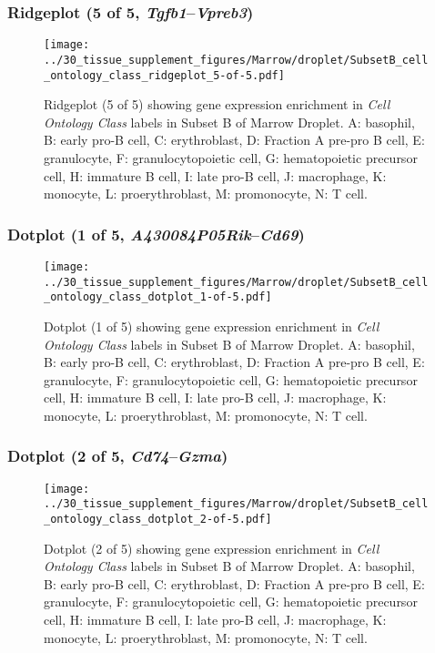 \clearpage

\subsubsection{Ridgeplot (5 of 5, \emph{Tgfb1}--\emph{Vpreb3})}
\begin{figure}[h]
\centering
\texttt{[image: ../30\_tissue\_supplement\_figures/Marrow/droplet/SubsetB\_cell\_ontology\_class\_ridgeplot\_5-of-5.pdf]}

\caption{ Ridgeplot (5 of 5)  showing gene expression enrichment in \emph{Cell Ontology Class} labels in Subset B of Marrow Droplet. A: basophil, B: early pro-B cell, C: erythroblast, D: Fraction A pre-pro B cell, E: granulocyte, F: granulocytopoietic cell, G: hematopoietic precursor cell, H: immature B cell, I: late pro-B cell, J: macrophage, K: monocyte, L: proerythroblast, M: promonocyte, N: T cell.}
\end{figure}


\clearpage

\subsubsection{Dotplot (1 of 5, \emph{A430084P05Rik}--\emph{Cd69})}
\begin{figure}[h]
\centering
\texttt{[image: ../30\_tissue\_supplement\_figures/Marrow/droplet/SubsetB\_cell\_ontology\_class\_dotplot\_1-of-5.pdf]}

\caption{ Dotplot (1 of 5)  showing gene expression enrichment in \emph{Cell Ontology Class} labels in Subset B of Marrow Droplet. A: basophil, B: early pro-B cell, C: erythroblast, D: Fraction A pre-pro B cell, E: granulocyte, F: granulocytopoietic cell, G: hematopoietic precursor cell, H: immature B cell, I: late pro-B cell, J: macrophage, K: monocyte, L: proerythroblast, M: promonocyte, N: T cell.}
\end{figure}


\clearpage

\subsubsection{Dotplot (2 of 5, \emph{Cd74}--\emph{Gzma})}
\begin{figure}[h]
\centering
\texttt{[image: ../30\_tissue\_supplement\_figures/Marrow/droplet/SubsetB\_cell\_ontology\_class\_dotplot\_2-of-5.pdf]}

\caption{ Dotplot (2 of 5)  showing gene expression enrichment in \emph{Cell Ontology Class} labels in Subset B of Marrow Droplet. A: basophil, B: early pro-B cell, C: erythroblast, D: Fraction A pre-pro B cell, E: granulocyte, F: granulocytopoietic cell, G: hematopoietic precursor cell, H: immature B cell, I: late pro-B cell, J: macrophage, K: monocyte, L: proerythroblast, M: promonocyte, N: T cell.}
\end{figure}


